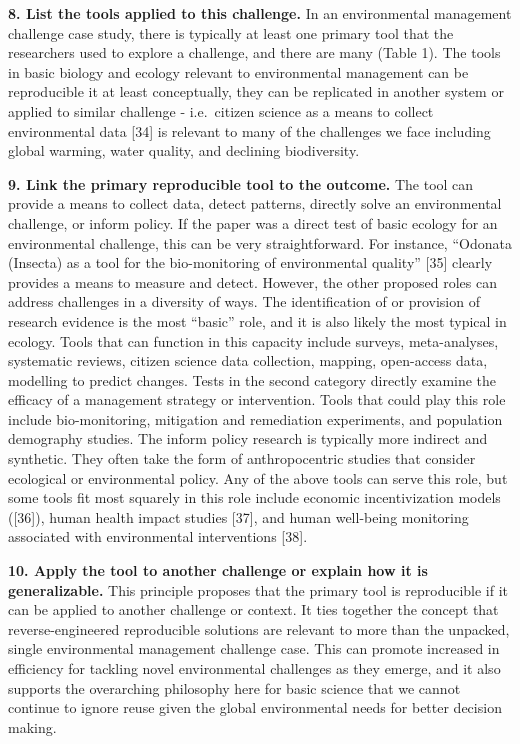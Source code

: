 \documentclass[10pt,letterpaper]{article}
\begin{document}
\textbf{8. List the tools applied to this challenge.} In an
environmental management challenge case study, there is typically at
least one primary tool that the researchers used to explore a challenge,
and there are many (Table 1). The tools in basic biology and ecology
relevant to environmental management can be reproducible it at least
conceptually, they can be replicated in another system or applied to
similar challenge - i.e.~citizen science as a means to collect
environmental data {[}34{]} is relevant to many of the challenges we
face including global warming, water quality, and declining
biodiversity.

\textbf{9. Link the primary reproducible tool to the outcome.} The tool
can provide a means to collect data, detect patterns, directly solve an
environmental challenge, or inform policy. If the paper was a direct
test of basic ecology for an environmental challenge, this can be very
straightforward. For instance, ``Odonata (Insecta) as a tool for the
bio-monitoring of environmental quality'' {[}35{]} clearly provides a
means to measure and detect. However, the other proposed roles can
address challenges in a diversity of ways. The identification of or
provision of research evidence is the most ``basic'' role, and it is
also likely the most typical in ecology. Tools that can function in this
capacity include surveys, meta-analyses, systematic reviews, citizen
science data collection, mapping, open-access data, modelling to predict
changes. Tests in the second category directly examine the efficacy of a
management strategy or intervention. Tools that could play this role
include bio-monitoring, mitigation and remediation experiments, and
population demography studies. The inform policy research is typically
more indirect and synthetic. They often take the form of anthropocentric
studies that consider ecological or environmental policy. Any of the
above tools can serve this role, but some tools fit most squarely in
this role include economic incentivization models ({[}36{]}), human
health impact studies {[}37{]}, and human well-being monitoring
associated with environmental interventions {[}38{]}.

\textbf{10. Apply the tool to another challenge or explain how it is
generalizable.} This principle proposes that the primary tool is
reproducible if it can be applied to another challenge or context. It
ties together the concept that reverse-engineered reproducible solutions
are relevant to more than the unpacked, single environmental management
challenge case. This can promote increased in efficiency for tackling
novel environmental challenges as they emerge, and it also supports the
overarching philosophy here for basic science that we cannot continue to
ignore reuse given the global environmental needs for better decision
making.
\end{document}
